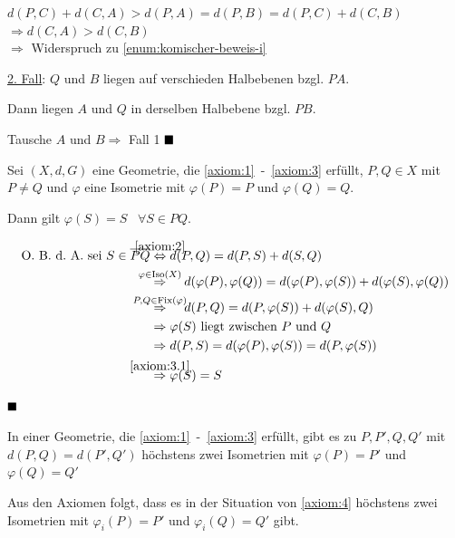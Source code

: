 \begin{beweis}
\begin{enumerate}[label=(\roman*)]
\begin{enumerate}[label=\alph*)]
                      $d(P,C) + d(C,A) > d(P,A) = d(P,B) = d(P,C) + d(C, B)$\\
                      $\Rightarrow d(C, A) > d(C, B)$\\
                      $\Rightarrow$ Widerspruch zu \cref{enum:komischer-beweis-i}
            \end{enumerate}
    \end{enumerate}

    \underline{2. Fall}: $Q$ und $B$ liegen auf verschieden Halbebenen bzgl. $PA$.

    Dann liegen $A$ und $Q$ in derselben Halbebene bzgl. $PB$.

    Tausche $A$ und $B \Rightarrow$  Fall 1 $\qed$
\end{beweis}

\begin{bemerkung}\label{kor:beh2'}
    Sei $(X, d, G)$ eine Geometrie, die \ref{axiom:1}~-~\ref{axiom:3}
    erfüllt, $P, Q \in X$ mit $P \neq Q$ und $\varphi$ eine Isometrie mit
    $\varphi(P) = P$ und $\varphi(Q) = Q$.

    Dann gilt $\varphi(S) = S\;\;\;\forall S \in PQ$.
\end{bemerkung}

\begin{beweis}
    \begin{align*}
        \text{\Obda sei } S \in \overline{PQ} &\overset{\mathclap{\ref{axiom:2}}}{\Leftrightarrow} d(P,Q) = d(P,S) + d(S,Q)\\
        &\overset{\mathclap{\varphi \in \Iso(X)}}{\Rightarrow}\hspace{4 mm} d(\varphi(P),\varphi(Q)) = d(\varphi(P),\varphi(S)) + d(\varphi(S),\varphi(Q))\\
        &\overset{\mathclap{P, Q \in \Fix(\varphi)}}{\Rightarrow}\hspace{4 mm} d(P, Q) = d(P,\varphi(S)) + d(\varphi(S), Q)\\
        &\Rightarrow \varphi(S) \text{ liegt zwischen } P \text{ und } Q\\
        &\Rightarrow d(P,S) = d(\varphi(P), \varphi(S)) = d(P, \varphi(S))\\
        &\overset{\mathclap{\ref{axiom:3.1}}}{\Rightarrow} \varphi(S) = S
    \end{align*}

    $\qed$
\end{beweis}

\begin{proposition}\label{satz:14.4}%
    In einer Geometrie, die \ref{axiom:1}~-~\ref{axiom:3} erfüllt,
    gibt es zu $P, P', Q, Q'$ mit $d(P, Q) = d(P', Q')$ höchstens
    zwei Isometrien mit $\varphi(P) = P'$ und $\varphi(Q) = Q'$

    Aus den Axiomen  folgt, dass es in
    der Situation von \ref{axiom:4} höchstens zwei Isometrien mit
    $\varphi_i(P) = P'$ und $\varphi_i(Q) = Q'$ gibt.
\end{proposition}

